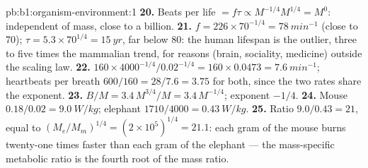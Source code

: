 \begin{solution}{pb:b1:organism-environment:1}
\textbf{20.} Beats per life $= f\tau \propto M^{-1/4}M^{1/4} = M^0$:
independent of mass, close to a billion.
\textbf{21.} $f = 226\times 70^{-1/4} = \qty{78}{min^{-1}}$ (close to
70); $\tau = 5.3\times 70^{1/4} = \qty{15}{yr}$, far below 80: the
human lifespan is the outlier, three to five times the mammalian trend,
for reasons (brain, sociality, medicine) outside the scaling law.
\textbf{22.} $160\times 4000^{-1/4}/0.02^{-1/4} = 160\times 0.0473 =
\qty{7.6}{min^{-1}}$; heartbeats per breath $600/160 = 28/7.6 = 3.75$
for both, since the two rates share the exponent.
\textbf{23.} $B/M = 3.4\,M^{3/4}/M = 3.4\,M^{-1/4}$; exponent $-1/4$.
\textbf{24.} Mouse $0.18/0.02 = \qty{9.0}{W/kg}$; elephant $1710/4000 =
\qty{0.43}{W/kg}$.
\textbf{25.} Ratio $9.0/0.43 = 21$, equal to $(M_e/M_m)^{1/4} =
(2\times 10^5)^{1/4} = 21.1$: each gram of the mouse burns twenty-one
times faster than each gram of the elephant --- the mass-specific
metabolic ratio is the fourth root of the mass ratio.
\end{solution}
